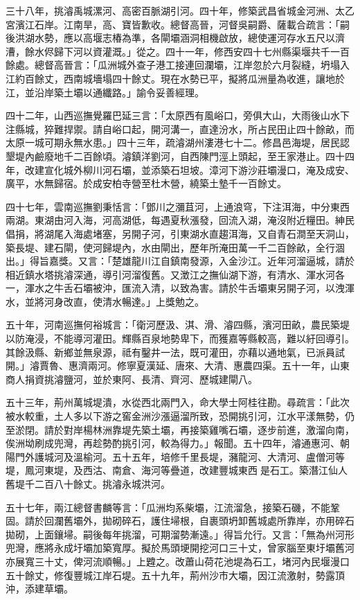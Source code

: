 \begin{pinyinscope}
三十八年，挑濬禹城漯河、高密百脈湖引河。四十年，修築武昌省城金河洲、太乙宮濱江石岸。江南旱，高、寶皆歉收。總督高晉，河督吳嗣爵、薩載合疏言：「嗣後洪湖水勢，應以高堰志椿為準，各閘壩涵洞相機啟放，總使運河存水五尺以濟漕，餘水侭歸下河以資灌溉。」從之。四十一年，修西安四十七州縣渠堰共千一百餘處。總督高晉言：「瓜洲城外查子港工接連回瀾壩，江岸忽於六月裂縫，坍塌入江約百餘丈，西南城墻塌四十餘丈。現在水勢已平，擬將瓜洲量為收進，讓地於江，並沿岸築土壩以通纖路。」諭令妥善經理。

四十二年，山西巡撫覺羅巴延三言：「太原西有風峪口，旁俱大山，大雨後山水下注縣城，猝難捍禦。請自峪口起，開河溝一，直達汾水，所占民田止四十餘畝，而太原一城可期永無水患。」四十三年，疏濬湖州漊港七十二。修昌邑海堤，居民認墾堤內鹼廢地千二百餘頃。濬鎮洋劉河，自西陳門涇上頭起，至王家港止。四十四年，改建宣化城外柳川河石壩，並添築石坦坡。漳河下游沙莊壩漫口，淹及成安、廣平，水無歸宿。於成安柏寺營至杜木營，繞築土墊千一百餘丈。

四十七年，雲南巡撫劉秉恬言：「鄧川之瀰苴河，上通浪穹，下注洱海，中分東西兩湖。東湖由河入海，河高湖低，每遇夏秋漲發，回流入湖，淹沒附近糧田。紳民倡捐，將湖尾入海處堵塞，另開子河，引東湖水直趨洱海，又自青石澗至天洞山，築長堤、建石閘，使河歸堤內，水由閘出，歷年所淹田萬一千二百餘畝，全行涸出。」得旨嘉獎。又言：「楚雄龍川江自鎮南發源，入金沙江。近年河溜逼城，請於相近鎮水塔挑濬深通，導引河溜復舊。又澂江之撫仙湖下游，有清水、渾水河各一，渾水之牛舌石壩被沖，匯流入清，以致為害。請於牛舌壩東另開子河，以洩渾水，並將河身改直，使清水暢達。」上獎勉之。

五十年，河南巡撫何裕城言：「衛河歷汲、淇、滑、濬四縣，濱河田畝，農民築堤以防淹浸，不能導河灌田。輝縣百泉地勢卑下，而獲嘉等縣較高，難以紆回導引。其餘汲縣、新鄉並無泉源，祗有鑿井一法，既可灌田，亦藉以通地氣，已派員試開。」濬賈魯、惠濟兩河。修寧夏漢延、唐來、大清、惠農四渠。五十一年，山東商人捐資挑濬鹽河，並於東阿、長清、齊河、歷城建閘八。

五十三年，荊州萬城堤潰，水從西北兩門入，命大學士阿桂往勘。尋疏言：「此次被水較重，土人多以下游之窖金洲沙漲逼溜所致，恐開挑引河，江水平漾無勢，仍至淤閉。請於對岸楊林洲靠堤先築土壩，再接築雞嘴石壩，逐步前進，激溜向南，俟洲坳刷成兜灣，再趁勢酌挑引河，較為得力。」報聞。五十四年，濬通惠河、朝陽門外護城河及溫榆河。五十五年，培修千里長堤，瀦龍河、大清河、盧僧河等堤，鳳河東堤，及西沽、南倉、海河等疊道，改建豐城東西是石工。築潛江仙人舊堤千二百八十餘丈。挑濬永城洪河。

五十七年，兩江總督書麟等言：「瓜洲均系柴壩，江流溜急，接築石磯，不能鞏固。請於回瀾舊壩外，拋砌碎石，護住埽根，自裹頭坍卸舊城處所靠岸，亦用碎石拋砌，上面鑲埽。嗣後每年挑溜，可期溜勢漸遠。」得旨允行。又言：「無為州河形兜灣，應將永成圩壩加築寬厚。擬於馬頭埂開挖河口三十丈，曾家腦至東圩壩舊河亦展寬三十丈，俾河流順暢。」上韙之。改蕭山荷花池堤為石工，堵河內民堰漫口五十餘丈，修復豐城江岸石堤。五十九年，荊州沙市大壩，因江流激射，勢露頂沖，添建草壩。


\end{pinyinscope}
